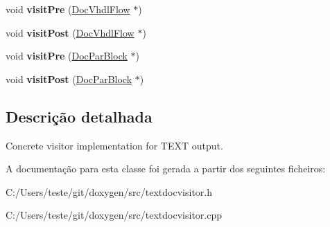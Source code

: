 \begin{DoxyCompactItemize}
\item 
\hypertarget{class_text_doc_visitor_ab7c53055027c60e0a3a9f4f93e9c3d85}{void {\bfseries visit\-Pre} (\hyperlink{class_doc_vhdl_flow}{Doc\-Vhdl\-Flow} $\ast$)}\label{class_text_doc_visitor_ab7c53055027c60e0a3a9f4f93e9c3d85}

\item 
\hypertarget{class_text_doc_visitor_a79febe42f6e032c27aad9a418f979eca}{void {\bfseries visit\-Post} (\hyperlink{class_doc_vhdl_flow}{Doc\-Vhdl\-Flow} $\ast$)}\label{class_text_doc_visitor_a79febe42f6e032c27aad9a418f979eca}

\item 
\hypertarget{class_text_doc_visitor_acc4035c695184dd01a26145a88c1a588}{void {\bfseries visit\-Pre} (\hyperlink{class_doc_par_block}{Doc\-Par\-Block} $\ast$)}\label{class_text_doc_visitor_acc4035c695184dd01a26145a88c1a588}

\item 
\hypertarget{class_text_doc_visitor_a4bd3a84f45e2f6dc6420638ee8e4ee27}{void {\bfseries visit\-Post} (\hyperlink{class_doc_par_block}{Doc\-Par\-Block} $\ast$)}\label{class_text_doc_visitor_a4bd3a84f45e2f6dc6420638ee8e4ee27}

\end{DoxyCompactItemize}


\subsection{Descrição detalhada}
Concrete visitor implementation for T\-E\-X\-T output. 

A documentação para esta classe foi gerada a partir dos seguintes ficheiros\-:\begin{DoxyCompactItemize}
\item 
C\-:/\-Users/teste/git/doxygen/src/textdocvisitor.\-h\item 
C\-:/\-Users/teste/git/doxygen/src/textdocvisitor.\-cpp\end{DoxyCompactItemize}
